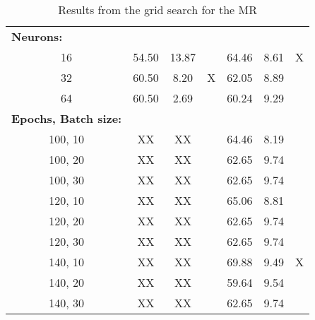 \documentclass[12pt,a4paper]{article}
\begin{document}
\begin{table}[]
\begin{tabular}{ccccccc}
\multicolumn{1}{l}{\textbf{Neurons:}} &  &  &  &  &  &  \\
16        		& 54.50    	& 13.87   &        & 64.46     & 8.61    & X     \\
32              & 60.50     & 8.20    & X      & 62.05     & 8.89    &       \\
64              & 60.50     & 2.69    &        & 60.24     & 9.29    &       \\ \hline
\multicolumn{1}{l}{\textbf{Epochs, Batch size:}}  &  &  &  &  &  &   \\
100, 10         & XX     & XX   &        & 64.46     & 8.19    &       \\
100, 20         & XX     & XX   &        & 62.65     & 9.74    &       \\
100, 30         & XX     & XX   &        & 62.65     & 9.74    &       \\
120, 10         & XX     & XX   &        & 65.06     & 8.81    &       \\
120, 20         & XX     & XX   &        & 62.65     & 9.74    &       \\
120, 30         & XX     & XX   &        & 62.65     & 9.74    &       \\
140, 10         & XX     & XX   &        & 69.88     & 9.49    & X     \\
140, 20         & XX     & XX   &        & 59.64     & 9.54    &       \\
140, 30         & XX     & XX   &        & 62.65     & 9.74    &       \\ \hline
\end{tabular}
\caption{Results from the grid search for the MR}
\label{tab:GridMorph}
\end{table}
\end{document}

